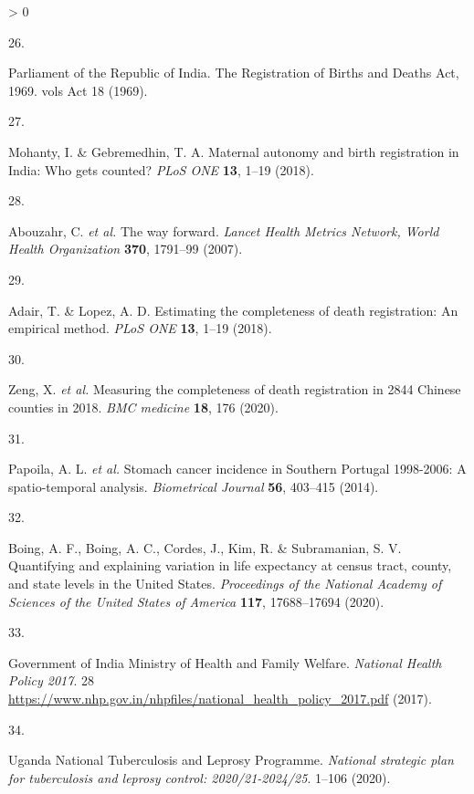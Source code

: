 \documentclass[
]{article}
\newlength{\cslhangindent}
\newlength{\csllabelwidth}
\newenvironment{CSLReferences}[2] %
 {%
  \setlength{\parindent}{0pt}
  \ifodd #1 \everypar{\setlength{\hangindent}{\cslhangindent}}\ignorespaces\fi
  \ifnum #2 > 0
  \setlength{\parskip}{#2\baselineskip}
  \fi
 }%
 {}
\newcommand{\CSLLeftMargin}[1]{\parbox[t]{\csllabelwidth}{#1}}
\newcommand{\CSLRightInline}[1]{\parbox[t]{\linewidth - \csllabelwidth}{#1}\break}
\begin{document}
\begin{CSLReferences}{0}{0}
\leavevmode\hypertarget{ref-ParliamentoftheRepublicofIndia1969}{}%
\CSLLeftMargin{26. }
\CSLRightInline{Parliament of the Republic of India. {The Registration of Births and Deaths Act, 1969}. vols Act 18 (1969).}

\leavevmode\hypertarget{ref-Mohanty2018}{}%
\CSLLeftMargin{27. }
\CSLRightInline{Mohanty, I. \& Gebremedhin, T. A. {Maternal autonomy and birth registration in India: Who gets counted?} \emph{PLoS ONE} \textbf{13}, 1--19 (2018).}

\leavevmode\hypertarget{ref-Abouzahr2007}{}%
\CSLLeftMargin{28. }
\CSLRightInline{Abouzahr, C. \emph{et al.} {The way forward}. \emph{Lancet Health Metrics Network, World Health Organization} \textbf{370}, 1791--99 (2007).}

\leavevmode\hypertarget{ref-Adair2018}{}%
\CSLLeftMargin{29. }
\CSLRightInline{Adair, T. \& Lopez, A. D. {Estimating the completeness of death registration: An empirical method}. \emph{PLoS ONE} \textbf{13}, 1--19 (2018).}

\leavevmode\hypertarget{ref-Zeng2020}{}%
\CSLLeftMargin{30. }
\CSLRightInline{Zeng, X. \emph{et al.} {Measuring the completeness of death registration in 2844 Chinese counties in 2018}. \emph{BMC medicine} \textbf{18}, 176 (2020).}

\leavevmode\hypertarget{ref-Papoila2014}{}%
\CSLLeftMargin{31. }
\CSLRightInline{Papoila, A. L. \emph{et al.} {Stomach cancer incidence in Southern Portugal 1998-2006: A spatio-temporal analysis}. \emph{Biometrical Journal} \textbf{56}, 403--415 (2014).}

\leavevmode\hypertarget{ref-Boing2020}{}%
\CSLLeftMargin{32. }
\CSLRightInline{Boing, A. F., Boing, A. C., Cordes, J., Kim, R. \& Subramanian, S. V. {Quantifying and explaining variation in life expectancy at census tract, county, and state levels in the United States}. \emph{Proceedings of the National Academy of Sciences of the United States of America} \textbf{117}, 17688--17694 (2020).}

\leavevmode\hypertarget{ref-IND_MOHFW2017}{}%
\CSLLeftMargin{33. }
\CSLRightInline{Government of India Ministry of Health and Family Welfare. \emph{{National Health Policy 2017}}. 28 \url{https://www.nhp.gov.in/nhpfiles/national_health_policy_2017.pdf} (2017).}

\leavevmode\hypertarget{ref-UgandaNationalTuberculosisandLeprosyProgramme2020a}{}%
\CSLLeftMargin{34. }
\CSLRightInline{Uganda National Tuberculosis and Leprosy Programme. \emph{{National strategic plan for tuberculosis and leprosy control: 2020/21-2024/25}}. 1--106 (2020).}


\end{CSLReferences}
\end{document}
